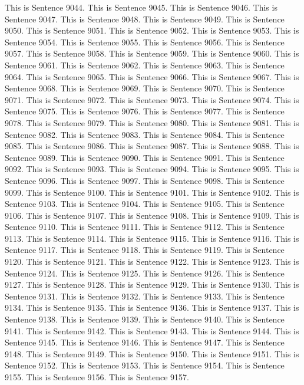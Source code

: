 \documentclass{article}
\begin{document}
This is Sentence 9044.
This is Sentence 9045.
This is Sentence 9046.
This is Sentence 9047.
This is Sentence 9048.
This is Sentence 9049.
This is Sentence 9050.
This is Sentence 9051.
This is Sentence 9052.
This is Sentence 9053.
This is Sentence 9054.
This is Sentence 9055.
This is Sentence 9056.
This is Sentence 9057.
This is Sentence 9058.
This is Sentence 9059.
This is Sentence 9060.
This is Sentence 9061.
This is Sentence 9062.
This is Sentence 9063.
This is Sentence 9064.
This is Sentence 9065.
This is Sentence 9066.
This is Sentence 9067.
This is Sentence 9068.
This is Sentence 9069.
This is Sentence 9070.
This is Sentence 9071.
This is Sentence 9072.
This is Sentence 9073.
This is Sentence 9074.
This is Sentence 9075.
This is Sentence 9076.
This is Sentence 9077.
This is Sentence 9078.
This is Sentence 9079.
This is Sentence 9080.
This is Sentence 9081.
This is Sentence 9082.
This is Sentence 9083.
This is Sentence 9084.
This is Sentence 9085.
This is Sentence 9086.
This is Sentence 9087.
This is Sentence 9088.
This is Sentence 9089.
This is Sentence 9090.
This is Sentence 9091.
This is Sentence 9092.
This is Sentence 9093.
This is Sentence 9094.
This is Sentence 9095.
This is Sentence 9096.
This is Sentence 9097.
This is Sentence 9098.
This is Sentence 9099.
This is Sentence 9100.
This is Sentence 9101.
This is Sentence 9102.
This is Sentence 9103.
This is Sentence 9104.
This is Sentence 9105.
This is Sentence 9106.
This is Sentence 9107.
This is Sentence 9108.
This is Sentence 9109.
This is Sentence 9110.
This is Sentence 9111.
This is Sentence 9112.
This is Sentence 9113.
This is Sentence 9114.
This is Sentence 9115.
This is Sentence 9116.
This is Sentence 9117.
This is Sentence 9118.
This is Sentence 9119.
This is Sentence 9120.
This is Sentence 9121.
This is Sentence 9122.
This is Sentence 9123.
This is Sentence 9124.
This is Sentence 9125.
This is Sentence 9126.
This is Sentence 9127.
This is Sentence 9128.
This is Sentence 9129.
This is Sentence 9130.
This is Sentence 9131.
This is Sentence 9132.
This is Sentence 9133.
This is Sentence 9134.
This is Sentence 9135.
This is Sentence 9136.
This is Sentence 9137.
This is Sentence 9138.
This is Sentence 9139.
This is Sentence 9140.
This is Sentence 9141.
This is Sentence 9142.
This is Sentence 9143.
This is Sentence 9144.
This is Sentence 9145.
This is Sentence 9146.
This is Sentence 9147.
This is Sentence 9148.
This is Sentence 9149.
This is Sentence 9150.
This is Sentence 9151.
This is Sentence 9152.
This is Sentence 9153.
This is Sentence 9154.
This is Sentence 9155.
This is Sentence 9156.
This is Sentence 9157.
\end{document}
